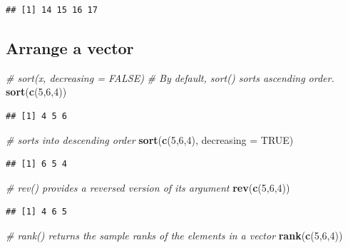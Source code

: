 \documentclass[]{book}
\newenvironment{Shaded}{\begin{snugshade}}{\end{snugshade}}
\newcommand{\KeywordTok}[1]{\textcolor[rgb]{0.13,0.29,0.53}{\textbf{{#1}}}}
\newcommand{\DataTypeTok}[1]{\textcolor[rgb]{0.13,0.29,0.53}{{#1}}}
\newcommand{\DecValTok}[1]{\textcolor[rgb]{0.00,0.00,0.81}{{#1}}}
\newcommand{\CommentTok}[1]{\textcolor[rgb]{0.56,0.35,0.01}{\textit{{#1}}}}
\newcommand{\OtherTok}[1]{\textcolor[rgb]{0.56,0.35,0.01}{{#1}}}
\newcommand{\NormalTok}[1]{{#1}}
\begin{document}
\begin{verbatim}
## [1] 14 15 16 17
\end{verbatim}

\subsection{Arrange a vector}\label{arrange-a-vector}

\begin{Shaded}
\begin{Highlighting}[]
\CommentTok{# sort(x, decreasing = FALSE) }
\CommentTok{# By default, sort() sorts ascending order.}
\KeywordTok{sort}\NormalTok{(}\KeywordTok{c}\NormalTok{(}\DecValTok{5}\NormalTok{,}\DecValTok{6}\NormalTok{,}\DecValTok{4}\NormalTok{))}
\end{Highlighting}
\end{Shaded}

\begin{verbatim}
## [1] 4 5 6
\end{verbatim}

\begin{Shaded}
\begin{Highlighting}[]
\CommentTok{# sorts into descending order}
\KeywordTok{sort}\NormalTok{(}\KeywordTok{c}\NormalTok{(}\DecValTok{5}\NormalTok{,}\DecValTok{6}\NormalTok{,}\DecValTok{4}\NormalTok{), }\DataTypeTok{decreasing =} \OtherTok{TRUE}\NormalTok{)}
\end{Highlighting}
\end{Shaded}

\begin{verbatim}
## [1] 6 5 4
\end{verbatim}

\begin{Shaded}
\begin{Highlighting}[]
\CommentTok{# rev() provides a reversed version of its argument}
\KeywordTok{rev}\NormalTok{(}\KeywordTok{c}\NormalTok{(}\DecValTok{5}\NormalTok{,}\DecValTok{6}\NormalTok{,}\DecValTok{4}\NormalTok{))}
\end{Highlighting}
\end{Shaded}

\begin{verbatim}
## [1] 4 6 5
\end{verbatim}

\begin{Shaded}
\begin{Highlighting}[]
\CommentTok{# rank() returns the sample ranks of the elements in a vector}
\KeywordTok{rank}\NormalTok{(}\KeywordTok{c}\NormalTok{(}\DecValTok{5}\NormalTok{,}\DecValTok{6}\NormalTok{,}\DecValTok{4}\NormalTok{))}
\end{Highlighting}
\end{Shaded}
\end{document}
